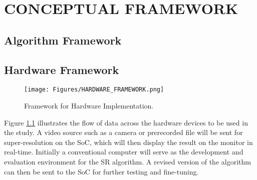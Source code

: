
\chapter{CONCEPTUAL FRAMEWORK} %

\label{Chapter3} %








\section{Algorithm Framework}



\section{Hardware Framework}
\begin{figure}
	\centering
	\texttt{[image: Figures/HARDWARE\_FRAMEWORK.png]}
	\caption[]{Framework for Hardware Implementation.}
	\label{fig:hardframe}
\end{figure}

Figure \ref{fig:hardframe} illustrates the flow of data across the hardware devices to be used in the study.
A video source such as a camera or prerecorded file will be sent for super-resolution on the SoC, which will then display the result on the monitor in real-time.
Initially a conventional computer will serve as the development and evaluation  environment for the SR algorithm.
A revised version of the algorithm can then be sent to the SoC for further testing and fine-tuning.



